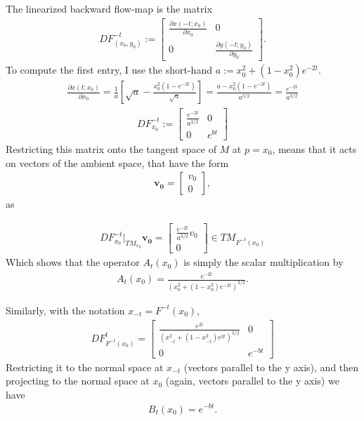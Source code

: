 \begin{solution}[9.4]
The linearized backward flow-map is the matrix
\begin{align}
    DF^{-t}_{(x_0,y_0)} := \begin{bmatrix} 
    \frac{\partial x(-t; x_0)}{\partial x_0} & 0 \\
    0 & \frac{\partial y(-t;y_0)}{\partial y_0}
    \end{bmatrix}.
\end{align}
To compute the first entry, I use the short-hand $a:=x_0^2 + (1-x_0^2)e^{-2t}$. 
\begin{align}
\frac{\partial x(t;x_0)}{\partial x_0} = \frac{1}{a}\left[\sqrt{a} - \frac{x_0^2(1-e^{-2t})}{\sqrt{a}}\right] = \frac{a - x_0^2(1-e^{-2t})}{a^{3/2}} = \frac{e^{-2t}}{a^{3/2}}
\end{align}
\begin{align}
    DF^{-t}_{x_0} := \begin{bmatrix} 
    \frac{e^{-2t}}{a^{3/2}} & 0 \\
    0 & e^{bt}
    \end{bmatrix}
\end{align}
Restricting this matrix onto the tangent space of $M$ at $p=x_0$, means that it acts on vectors of the ambient space, that have the form
\begin{align}
\mathbf{v_0} = \begin{bmatrix}
v_0 \\
0
\end{bmatrix},
\end{align}
as

\begin{align}
    DF^{-t}_{x_0}|_{TM_{x_0}} \mathbf{v_0} = \begin{bmatrix}\frac{e^{-2t}}{a^{3/2}}v_0 \\ 0 \end{bmatrix} \in TM_{F^{-t}(x_0)}
\end{align}
Which shows that the operator $A_t(x_0)$ is simply the scalar multiplication by
\begin{align}
    \label{eqat}
    A_t(x_0) = \frac{e^{-2t}}{(x_0^2 + (1-x_0^2)e^{-2t})^{3/2}}.
\end{align}

Similarly, with the notation $x_{-t} = F^{-t}(x_0)$,
\begin{align}
DF^{t}_{F^{-t}(x_0)} = \begin{bmatrix} \frac{e^{2t}}{(x_{-t}^2 + (1-x_{-t}^2)e^{2t})^{3/2}} & 0 \\
0  & e^{-bt}\end{bmatrix}\end{align}
Restricting it to the normal space at $x_{-t}$ (vectors parallel to the y axis), and then projecting to the normal space at $x_0$ (again, vectors parallel to the y axis) we have
\begin{align}
\label{eqbt}
B_t(x_0) = e^{-bt}. 
\end{align}


\end{solution}
